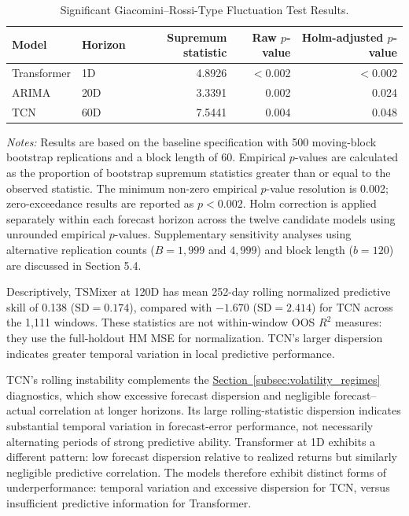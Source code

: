 \documentclass[runningheads,orivec]{llncs}
\begin{document}
\begin{table}[htbp]
\centering
\caption{Significant Giacomini--Rossi-Type Fluctuation Test Results.}\label{tab:h3_fluctuation_sig}
\setlength{\tabcolsep}{5pt}
\begin{tabular}{llrrr}
\hline
Model & Horizon & Supremum statistic & Raw $p$-value & Holm-adjusted $p$-value \\
\hline
Transformer & 1D  & 4.8926 & $<$0.002 & $<$0.002 \\
ARIMA       & 20D & 3.3391 & 0.002    & 0.024 \\
TCN         & 60D & 7.5441 & 0.004    & 0.048 \\
\hline
\end{tabular}
\par\vspace{4pt}\parbox{\linewidth}{\scriptsize\textit{Notes:} Results are based on the baseline specification with 500 moving-block bootstrap replications and a block length of 60. Empirical $p$-values are calculated as the proportion of bootstrap supremum statistics greater than or equal to the observed statistic. The minimum non-zero empirical $p$-value resolution is 0.002; zero-exceedance results are reported as $p<0.002$. Holm correction is applied separately within each forecast horizon across the twelve candidate models using unrounded empirical $p$-values. Supplementary sensitivity analyses using alternative replication counts ($B=1,999$ and $4,999$) and block length ($b=120$) are discussed in Section 5.4.}
\end{table}

Descriptively, TSMixer at 120D has mean 252-day rolling normalized predictive skill of 0.138 ($\mathrm{SD}=0.174$), compared with $-1.670$ ($\mathrm{SD}=2.414$) for TCN across the 1,111 windows. These statistics are not within-window OOS $R^2$ measures: they use the full-holdout HM MSE for normalization. TCN's larger dispersion indicates greater temporal variation in local predictive performance.

TCN's rolling instability complements the \hyperref[subsec:volatility_regimes]{Section~\ref*{subsec:volatility_regimes}} diagnostics, which show excessive forecast dispersion and negligible forecast--actual correlation at longer horizons. Its large rolling-statistic dispersion indicates substantial temporal variation in forecast-error performance, not necessarily alternating periods of strong predictive ability. Transformer at 1D exhibits a different pattern: low forecast dispersion relative to realized returns but similarly negligible predictive correlation. The models therefore exhibit distinct forms of underperformance: temporal variation and excessive dispersion for TCN, versus insufficient predictive information for Transformer.
\end{document}
